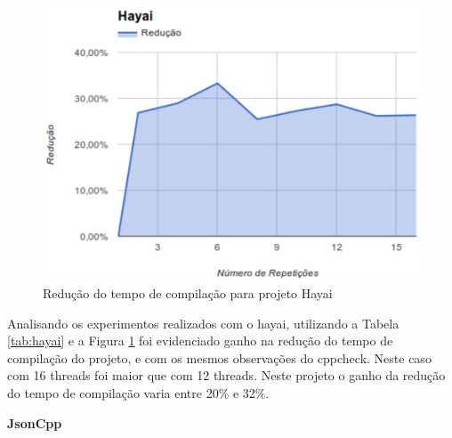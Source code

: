\begin{figure}[h]
    \centering
        \includegraphics[keepaspectratio=true,scale=1]{figuras/hayai.eps}
    \caption{Redução do tempo de compilação para projeto Hayai}
    \label{hayai}
\end{figure}
Analisando os experimentos realizados com o hayai, utilizando a Tabela \ref{tab:hayai} e a Figura \ref{hayai} foi evidenciado ganho
 na redução do tempo de compilação do projeto, e com os mesmos
 observações do cppcheck. Neste caso com 16 threads foi maior que com
 12 threads. Neste projeto o ganho da redução do tempo de
 compilação varia entre 20\% e 32\%.

\textbf{JsonCpp}

